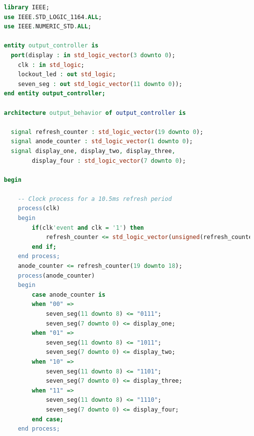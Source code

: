 \documentclass[11pt]{article}
\begin{document}
\begin{appendices}
\begin{lstlisting}[language=VHDL]
library IEEE;
use IEEE.STD_LOGIC_1164.ALL;
use IEEE.NUMERIC_STD.ALL;

entity output_controller is
  port(display : in std_logic_vector(3 downto 0);
    clk : in std_logic;
    lockout_led : out std_logic;
    seven_seg : out std_logic_vector(11 downto 0));
end entity output_controller;

architecture output_behavior of output_controller is

  signal refresh_counter : std_logic_vector(19 downto 0);
  signal anode_counter : std_logic_vector(1 downto 0);
  signal display_one, display_two, display_three, 
  		display_four : std_logic_vector(7 downto 0);

begin

    -- Clock process for a 10.5ms refresh period
    process(clk)
    begin
        if(clk'event and clk = '1') then
            refresh_counter <= std_logic_vector(unsigned(refresh_counter) + 1);
        end if;
    end process;
    anode_counter <= refresh_counter(19 downto 18);
    process(anode_counter)
    begin
        case anode_counter is
        when "00" =>
            seven_seg(11 downto 8) <= "0111";
            seven_seg(7 downto 0) <= display_one;
        when "01" =>
            seven_seg(11 downto 8) <= "1011";
            seven_seg(7 downto 0) <= display_two;
        when "10" =>
            seven_seg(11 downto 8) <= "1101";
            seven_seg(7 downto 0) <= display_three;
        when "11" =>
            seven_seg(11 downto 8) <= "1110";
            seven_seg(7 downto 0) <= display_four;
        end case;
    end process;


\end{lstlisting}
\end{appendices}
\end{document}

